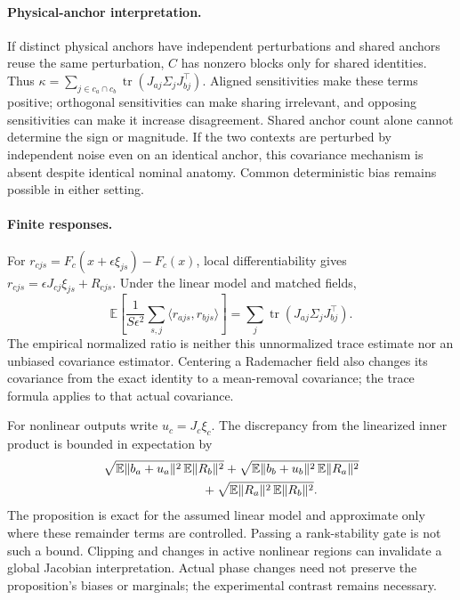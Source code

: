 \paragraph{Physical-anchor interpretation.}
If distinct physical anchors have independent perturbations and shared anchors reuse the same perturbation, $C$ has nonzero blocks only for shared identities. Thus $\kappa=\sum_{j\in c_a\cap c_b}\operatorname{tr}(J_{aj}\Sigma_jJ_{bj}^\top)$. Aligned sensitivities make these terms positive; orthogonal sensitivities can make sharing irrelevant, and opposing sensitivities can make it increase disagreement. Shared anchor count alone cannot determine the sign or magnitude. If the two contexts are perturbed by independent noise even on an identical anchor, this covariance mechanism is absent despite identical nominal anatomy. Common deterministic bias remains possible in either setting.

\paragraph{Finite responses.}
For $r_{cjs}=F_c(x+\epsilon\xi_{js})-F_c(x)$, local differentiability gives $r_{cjs}=\epsilon J_{cj}\xi_{js}+R_{cjs}$. Under the linear model and matched fields,
\begin{equation}
\mathbb E\left[\frac{1}{S\epsilon^2}\sum_{s,j}\langle r_{ajs},r_{bjs}\rangle\right]
=\sum_j\operatorname{tr}(J_{aj}\Sigma_jJ_{bj}^\top).
\end{equation}
The empirical normalized ratio is neither this unnormalized trace estimate nor an unbiased covariance estimator. Centering a Rademacher field also changes its covariance from the exact identity to a mean-removal covariance; the trace formula applies to that actual covariance.

For nonlinear outputs write $u_c=J_c\xi_c$. The discrepancy from the linearized inner product is bounded in expectation by
\begin{align}
&\sqrt{\mathbb E\|b_a+u_a\|^2\,\mathbb E\|R_b\|^2}
+\sqrt{\mathbb E\|b_b+u_b\|^2\,\mathbb E\|R_a\|^2}\nonumber\\
&\hspace{28mm}+\sqrt{\mathbb E\|R_a\|^2\,\mathbb E\|R_b\|^2}.
\end{align}
The proposition is exact for the assumed linear model and approximate only where these remainder terms are controlled. Passing a rank-stability gate is not such a bound. Clipping and changes in active nonlinear regions can invalidate a global Jacobian interpretation. Actual phase changes need not preserve the proposition's biases or marginals; the experimental contrast remains necessary.

